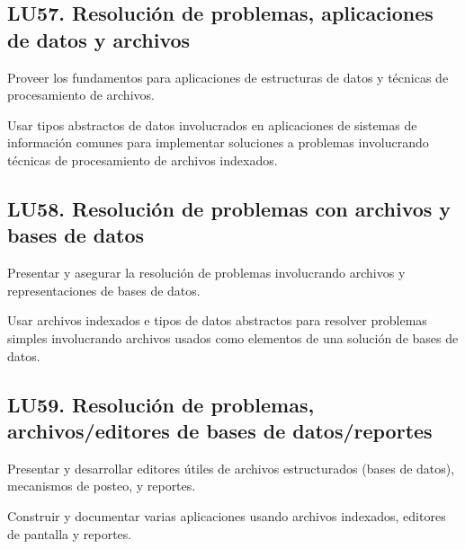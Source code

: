 \subsection{LU57. Resolución de problemas, aplicaciones de datos y archivos}\label{sec:BOK-LU57}\label{sec:LU57}
\begin{LearningUnit}
\begin{LUGoal}
\item Proveer los fundamentos para aplicaciones de estructuras de datos y técnicas de procesamiento de archivos.
\end{LUGoal}

\begin{LUObjective}
\item Usar tipos abstractos de datos involucrados en aplicaciones de sistemas de información comunes para implementar soluciones a problemas involucrando técnicas de procesamiento de archivos indexados.
\end{LUObjective}
\end{LearningUnit}

\subsection{LU58. Resolución de problemas con archivos y bases de datos}\label{sec:BOK-LU58}\label{sec:LU58}
\begin{LearningUnit}
\begin{LUGoal}
\item Presentar y asegurar la resolución de problemas involucrando archivos y representaciones de bases de datos.
\end{LUGoal}

\begin{LUObjective}
\item Usar archivos indexados e tipos de datos abstractos para resolver problemas simples involucrando archivos usados como elementos de una solución de bases de datos.
\end{LUObjective}
\end{LearningUnit}

\subsection{LU59. Resolución de problemas, archivos/editores de bases de datos/reportes}\label{sec:BOK-LU59}\label{sec:LU59}
\begin{LearningUnit}
\begin{LUGoal}
\item Presentar y desarrollar editores útiles de archivos estructurados (bases de datos), mecanismos de posteo, y reportes.
\end{LUGoal}

\begin{LUObjective}
\item Construir y documentar varias aplicaciones usando archivos indexados, editores de pantalla y reportes.
\end{LUObjective}
\end{LearningUnit}

